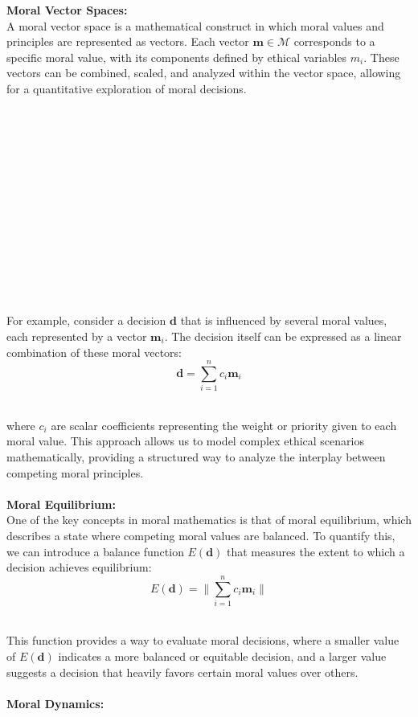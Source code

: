\documentclass{article}
\begin{document}
\textbf{Moral Vector Spaces:}
\\

A moral vector space is a mathematical construct in which moral values and principles are represented as vectors. Each vector \( \mathbf{m} \in \mathcal{M} \) corresponds to a specific moral value, with its components defined by ethical variables \( m_i \). These vectors can be combined, scaled, and analyzed within the vector space, allowing for a quantitative exploration of moral decisions.
\\

\

\

\

\

\

\

\

\

For example, consider a decision \( \mathbf{d} \) that is influenced by several moral values, each represented by a vector \( \mathbf{m}_i \). The decision itself can be expressed as a linear combination of these moral vectors:
\[
\mathbf{d} = \sum_{i=1}^{n} c_i \mathbf{m}_i
\]
\

where \( c_i \) are scalar coefficients representing the weight or priority given to each moral value. This approach allows us to model complex ethical scenarios mathematically, providing a structured way to analyze the interplay between competing moral principles.
\\
\\

\textbf{Moral Equilibrium:}
\\

One of the key concepts in moral mathematics is that of moral equilibrium, which describes a state where competing moral values are balanced. To quantify this, we can introduce a balance function \( E(\mathbf{d}) \) that measures the extent to which a decision achieves equilibrium:
\[
E(\mathbf{d}) = \lVert \sum_{i=1}^{n} c_i \mathbf{m}_i \rVert
\]
\

This function provides a way to evaluate moral decisions, where a smaller value of \( E(\mathbf{d}) \) indicates a more balanced or equitable decision, and a larger value suggests a decision that heavily favors certain moral values over others.
\\
\\

\textbf{Moral Dynamics:}
\\
\end{document}
